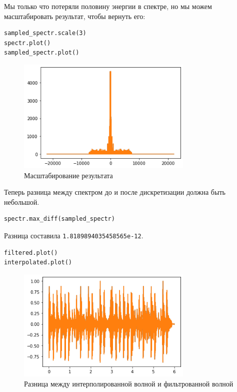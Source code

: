 \documentclass[a4paper,12pt]{report}
\begin{document}
Мы только что потеряли половину энергии в спектре, но мы можем масштабировать результат, чтобы вернуть его:

\begin{lstlisting}[caption=Масштабирование результата]
sampled_spectr.scale(3)
spectr.plot()
sampled_spectr.plot()
\end{lstlisting}

\begin{figure}[H]
        \centering
        \includegraphics[width=0.75\textwidth]{6.png}
        \caption{Масштабирование результата}
        \label{6}
\end{figure}

Теперь разница между спектром до и после дискретизации должна быть небольшой.

\begin{lstlisting}[caption=Разница между спектром до и после дискретизации]
spectr.max_diff(sampled_spectr)
\end{lstlisting}

Разница составила \texttt{1.8189894035458565e-12}.

\begin{lstlisting}[caption=Разница между интерполированной волной и фильтрованной волной]
filtered.plot()
interpolated.plot()
\end{lstlisting}

\begin{figure}[H]
        \centering
        \includegraphics[width=0.75\textwidth]{7.png}
        \caption{Разница между интерполированной волной и фильтрованной волной}
        \label{7}
\end{figure}
\end{document}
